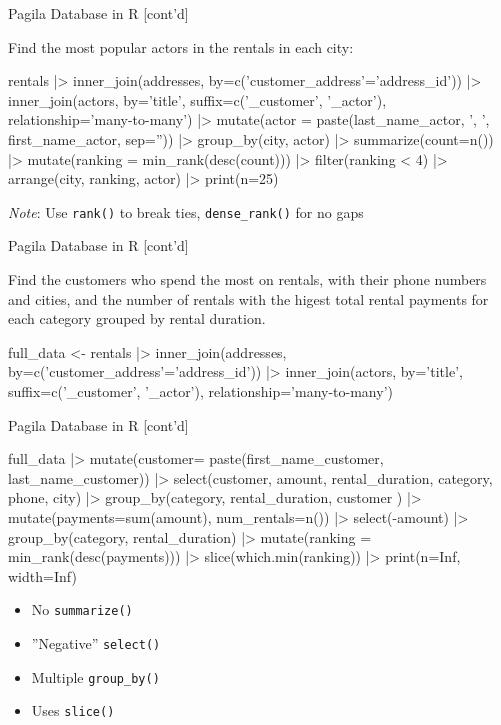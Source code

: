 \documentclass[ignorenonframetext,xcolor=x11names]{beamer}
\begin{document}
\begin{frame}[fragile]{Pagila Database in R \small [cont'd]}

Find the most popular actors in the rentals in each city:

\scriptsize
\begin{Rcode}
rentals |> 
   inner_join(addresses,
       by=c('customer_address'='address_id')) |>
   inner_join(actors,
       by='title',
       suffix=c('_customer', '_actor'),
       relationship='many-to-many') |>
   mutate(actor = 
       paste(last_name_actor, ', ', 
       first_name_actor, sep='')) |>
   group_by(city, actor) |>
   summarize(count=n()) |>
   mutate(ranking = min_rank(desc(count))) |>
   filter(ranking < 4) |>
   arrange(city, ranking, actor) |>
   print(n=25)
\end{Rcode}

\normalsize
\emph{Note}: Use \texttt{rank()} to break ties, \texttt{dense\_rank()} for no gaps
\end{frame}

\begin{frame}[fragile]{Pagila Database in R \small [cont'd]}

Find the customers who spend the most on rentals, with their phone numbers and cities, and the number of rentals with the higest total rental payments for each category grouped by rental duration.

\footnotesize
\begin{Rcode}
full_data <- 
   rentals |> 
     inner_join(addresses,
       by=c('customer_address'='address_id')) |>
     inner_join(actors,
       by='title',
       suffix=c('_customer', '_actor'),
       relationship='many-to-many')
\end{Rcode}
\end{frame}

\begin{frame}[fragile]{Pagila Database in R \small [cont'd]}
\footnotesize
\begin{Rcode}
full_data |>
   mutate(customer=
     paste(first_name_customer, last_name_customer)) |>
   select(customer, amount, rental_duration, 
          category, phone, city) |>
   group_by(category, rental_duration, customer ) |>
   mutate(payments=sum(amount), num_rentals=n()) |>
   select(-amount) |>
   group_by(category, rental_duration) |>
   mutate(ranking = min_rank(desc(payments))) |>
   slice(which.min(ranking)) |>
   print(n=Inf, width=Inf)
\end{Rcode}
\normalsize

\begin{itemize}
  \item No \texttt{summarize()}
  \item ''Negative'' \texttt{select()}
  \item Multiple \texttt{group\_by()}
  \item Uses \texttt{slice()}
\end{itemize}
\end{frame}
\end{document}
